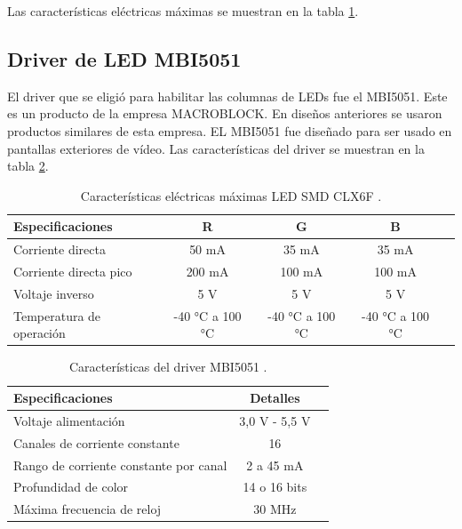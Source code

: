 Las características eléctricas máximas se muestran en la tabla \ref{tab:MAXLEDCLX6F}.

\pagebreak


\subsection{Driver de LED MBI5051}
El driver que se eligió para habilitar las columnas de LEDs fue el MBI5051. Este es un producto de la empresa MACROBLOCK. En diseños anteriores se usaron productos similares de esta empresa. EL MBI5051 fue diseñado para ser usado en pantallas exteriores de vídeo. Las características del driver se muestran en la tabla \ref{tab:driverled}.
 
\begin{table}[h]
\centering
\caption[Características eléctricas máximas LED CLX6F]{Características eléctricas máximas LED SMD CLX6F \protect\footnotemark.}
\begin{tabular}{l c c c c}
\toprule
\textbf{Especificaciones}& \textbf{R} & \textbf{G} & \textbf{B}\\
\midrule 


Corriente directa &50 mA &35 mA &35 mA\\
Corriente directa pico &200 mA &100 mA &100 mA \\
Voltaje inverso &5 V &5 V &5 V\\
Temperatura de operación &-40 \si{\degree}C a 100 \si{\degree}C  &-40 \si{\degree}C a 100 \si{\degree}C  &-40 \si{\degree}C a 100 \si{\degree}C\\


\bottomrule
\hline
\end{tabular}
\label{tab:MAXLEDCLX6F}
\end{table}


\begin{table}[h]
\centering
\caption[Características MBI5051]{Características del driver MBI5051 \protect\footnotemark.}
\begin{tabular}{l c c}
\toprule
\textbf{Especificaciones}& \textbf{Detalles}\\
\midrule 

Voltaje alimentación & 3,0 V - 5,5 V\\
Canales de corriente constante & 16\\
Rango de corriente constante por canal & 2 a 45 mA\\
Profundidad de color & 14 o 16 bits\\
Máxima frecuencia de reloj & 30 MHz\\

\bottomrule
\hline
\end{tabular}
\label{tab:driverled}
\end{table}


